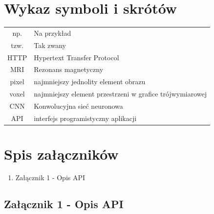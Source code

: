 \documentclass[a4paper,11pt,twoside]{report}
\theoremstyle{definition}
\begin{document}
\chapter*{Wykaz symboli i skrótów}

\begin{tabular}{cl}
np. & Na przykład \\
tzw. & Tak zwany \\
HTTP & Hypertext Transfer Protocol \\
MRI & Rezonans magnetyczny \\
pixel &  najmniejszy jednolity element obrazu  \\
voxel & najmniejszy element przestrzeni w grafice trójwymiarowej \\
CNN & Konwolucyjna sieć neuronowa \\
API & interfejs programistyczny aplikacji \\
\end{tabular}
\thispagestyle{empty}


\listoffigures
\thispagestyle{empty}


\renewcommand{\listtablename}{Spis tabel}
\listoftables
\thispagestyle{empty}




\chapter*{Spis załączników}
\begin{enumerate}[itemsep = 0pt]
\item Załącznik 1 - Opis API
\end{enumerate}
\thispagestyle{empty}


\newpage
\pagestyle{empty} 
\section{Załącznik 1 - Opis API}

\end{document}
